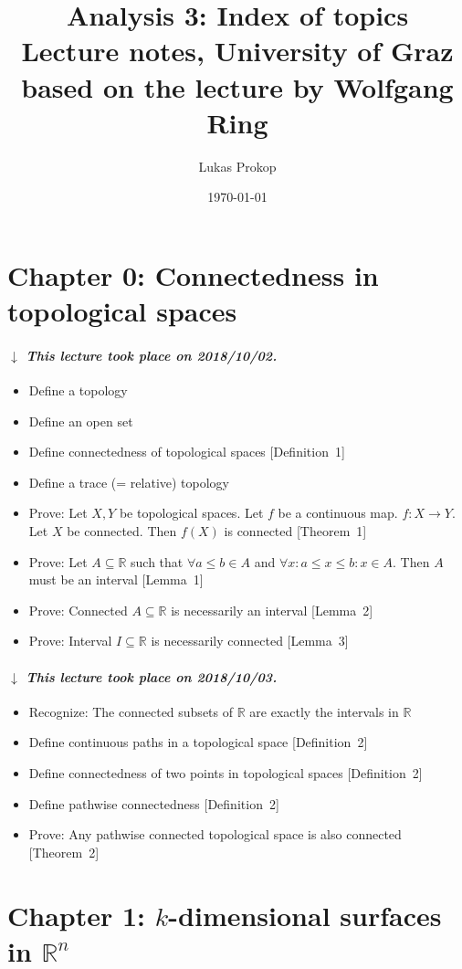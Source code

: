 \documentclass{article}
\title{
  Analysis 3: Index of topics \\
  \large{Lecture notes, University of Graz} \\
  based on the lecture by Wolfgang Ring
}
\date{\today}
\author{Lukas Prokop}
\numberwithin{lecref}{section}
\newcommand{\dateref}[1]{%
  \begin{mdframed}[backgroundcolor=gray!10,innerbottommargin=0pt,innertopmargin=0pt]
    \paragraph{\textit{$\downarrow$ This lecture took place on #1.}}%
  \end{mdframed}%
}
\begin{document}
\maketitle

\section*{Chapter 0: Connectedness in topological spaces}

\dateref{2018/10/02}


\begin{itemize}
  \item Define a topology
  \item Define an open set
  \item Define connectedness of topological spaces [Definition~1]
  \item Define a trace (= relative) topology
  \item Prove: Let $X, Y$ be topological spaces. Let $f$ be a continuous map. $f: X \to Y$. Let $X$ be connected. Then $f(X)$ is connected [Theorem~1]
  \item Prove: Let $A \subseteq \mathbb R$ such that $\forall a \leq b \in A$ and $\forall x: a \leq x \leq b: x \in A$. Then $A$ must be an interval [Lemma~1]
  \item Prove: Connected $A \subseteq \mathbb R$ is necessarily an interval [Lemma~2]
  \item Prove: Interval $I \subseteq \mathbb R$ is necessarily connected [Lemma~3]
\end{itemize}

\dateref{2018/10/03}

\begin{itemize}
  \item Recognize: The connected subsets of $\mathbb R$ are exactly the intervals in $\mathbb R$
  \item Define continuous paths in a topological space [Definition~2]
  \item Define connectedness of two points in topological spaces [Definition~2]
  \item Define pathwise connectedness [Definition~2]
  \item Prove: Any pathwise connected topological space is also connected [Theorem~2]
\end{itemize}

\section*{Chapter 1: $k$-dimensional surfaces in $\mathbb R^n$}
\end{document}
